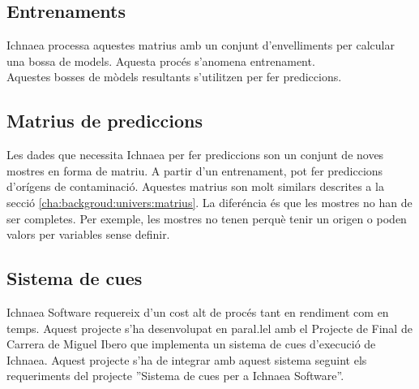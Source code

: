 \subsection{Entrenaments}
Ichnaea processa aquestes matrius amb un conjunt d'envelliments per calcular una bossa de models. Aquesta proc\'{e}s s'anomena entrenament. \\

Aquestes bosses de m\`{o}dels resultants s'utilitzen per fer prediccions.

\subsection{Matrius de prediccions}
Les dades que necessita Ichnaea per fer prediccions son un conjunt de noves mostres en forma de matriu. A partir d'un entrenament, pot fer prediccions d'orígens de contaminaci\'{o}. Aquestes matrius son molt similars descrites a la secci\'{o} \ref{cha:backgroud:univers:matrius}. La difer\'{e}ncia \'{e}s que les mostres no han de ser completes. Per exemple, les mostres no tenen perquè tenir un origen o poden valors per variables sense definir.

\subsection{Sistema de cues}
Ichnaea Software requereix d'un cost alt de proc\'{e}s tant en rendiment com en temps. Aquest projecte s'ha desenvolupat en paral.lel amb el Projecte de Final de Carrera de Miguel Ibero que implementa un sistema de cues d'execuci\'{o} de Ichnaea. Aquest projecte s'ha de integrar amb aquest sistema seguint els requeriments del projecte ''Sistema de cues per a Ichnaea Software''.